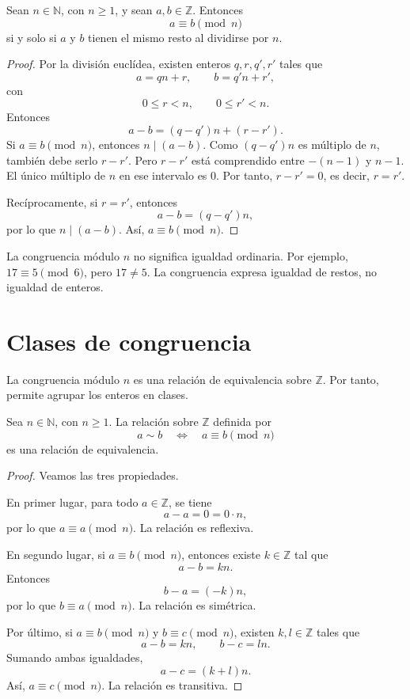 \begin{proposicion}
Sean \(n\in\mathbb{N}\), con \(n\geq 1\), y sean \(a,b\in\mathbb{Z}\). Entonces
\[
  a \equiv b \pmod n
\]
si y solo si \(a\) y \(b\) tienen el mismo resto al dividirse por \(n\).
\end{proposicion}

\begin{proof}
Por la división euclídea, existen enteros \(q,r,q',r'\) tales que
\[
  a=qn+r, \qquad b=q'n+r',
\]
con
\[
  0\leq r<n, \qquad 0\leq r'<n.
\]
Entonces
\[
  a-b=(q-q')n+(r-r').
\]
Si \(a\equiv b\pmod n\), entonces \(n\mid(a-b)\). Como \((q-q')n\) es múltiplo de \(n\), también debe serlo \(r-r'\). Pero \(r-r'\) está comprendido entre \(-(n-1)\) y \(n-1\). El único múltiplo de \(n\) en ese intervalo es \(0\). Por tanto, \(r-r'=0\), es decir, \(r=r'\).

Recíprocamente, si \(r=r'\), entonces
\[
  a-b=(q-q')n,
\]
por lo que \(n\mid(a-b)\). Así, \(a\equiv b\pmod n\).
\end{proof}

\begin{advertencia}
La congruencia módulo \(n\) no significa igualdad ordinaria. Por ejemplo, \(17\equiv 5\pmod 6\), pero \(17\neq 5\). La congruencia expresa igualdad de restos, no igualdad de enteros.
\end{advertencia}

\section{Clases de congruencia}

La congruencia módulo \(n\) es una relación de equivalencia sobre \(\mathbb{Z}\). Por tanto, permite agrupar los enteros en clases.

\begin{proposicion}
Sea \(n\in\mathbb{N}\), con \(n\geq 1\). La relación sobre \(\mathbb{Z}\) definida por
\[
  a\sim b \quad \Longleftrightarrow \quad a\equiv b\pmod n
\]
es una relación de equivalencia.
\end{proposicion}

\begin{proof}
Veamos las tres propiedades.

En primer lugar, para todo \(a\in\mathbb{Z}\), se tiene
\[
  a-a=0=0\cdot n,
\]
por lo que \(a\equiv a\pmod n\). La relación es reflexiva.

En segundo lugar, si \(a\equiv b\pmod n\), entonces existe \(k\in\mathbb{Z}\) tal que
\[
  a-b=kn.
\]
Entonces
\[
  b-a=(-k)n,
\]
por lo que \(b\equiv a\pmod n\). La relación es simétrica.

Por último, si \(a\equiv b\pmod n\) y \(b\equiv c\pmod n\), existen \(k,l\in\mathbb{Z}\) tales que
\[
  a-b=kn, \qquad b-c=ln.
\]
Sumando ambas igualdades,
\[
  a-c=(k+l)n.
\]
Así, \(a\equiv c\pmod n\). La relación es transitiva.
\end{proof}

